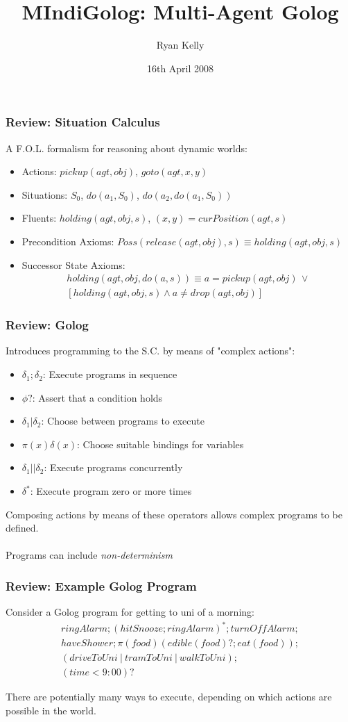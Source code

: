\documentclass[compress]{beamer}
\title{MIndiGolog: Multi-Agent Golog}
\author{Ryan Kelly}
\institute[The University of Melbourne]
{
  rfk@csse.unimelb.edu.au
}
\date[]
{16th April 2008}
\begin{document}
\begin{frame}
  \titlepage
\end{frame}

\begin{frame}
\frametitle{Review: Situation Calculus}

A F.O.L. formalism for reasoning about dynamic worlds:

\begin{itemize}
\item Actions: $pickup(agt,obj)$, $goto(agt,x,y)$
\item Situations: $S_{0}$, $do(a_{1},S_{0})$, $do(a_{2},do(a_{1},S_{0}))$
\item Fluents: $holding(agt,obj,s)$, $(x,y)=curPosition(agt,s)$
\item Precondition Axioms: $Poss(release(agt,obj),s) \equiv holding(agt,obj,s)$
\item Successor State Axioms:
\begin{multline*}
holding(agt,obj,do(a,s))\equiv a=pickup(agt,obj)\,\vee\\
\left[holding(agt,obj,s)\wedge a\neq drop(agt,obj)\right]
\end{multline*}
\end{itemize}
\end{frame}

\begin{frame}
\frametitle{Review: Golog}
Introduces programming to the S.C. by means of "complex actions":
\begin{itemize}
  \item $\delta_1;\delta_2$: Execute programs in sequence
  \item $\phi?$: Assert that a condition holds
  \item $\delta_1|\delta_2$: Choose between programs to execute
  \item $\pi(x)\delta(x)$: Choose suitable bindings for variables
  \item $\delta_1||\delta_2$: Execute programs concurrently
  \item $\delta^*$: Execute program zero or more times
\end{itemize}
Composing actions by means of these operators allows complex programs
to be defined.\\
\ \\
Programs can include \emph{non-determinism}
\end{frame}

\begin{frame}
\frametitle{Review: Example Golog Program}
Consider a Golog program for getting to uni of a morning:\[
\begin{array}{c}
ringAlarm;(hitSnooze; ringAlarm)^*;turnOffAlarm;\\
haveShower;\pi(food)(edible(food)?;eat(food));\\
(driveToUni\ |\ tramToUni\ |\ walkToUni);\\
(time<9:00)?
\end{array}\]

There are potentially many ways to execute, depending on which actions
are possible in the world.
\end{frame}
\end{document}
